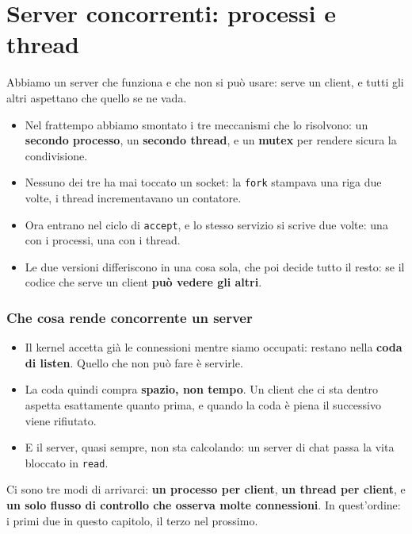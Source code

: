 \chapter{Server concorrenti: processi e thread}

Abbiamo un server che funziona e che non si può usare: serve un client, e tutti gli altri aspettano che quello se ne vada.
\begin{itemize}
    \item Nel frattempo abbiamo smontato i tre meccanismi che lo risolvono: un \textbf{secondo processo}, un \textbf{secondo
          thread}, e un \textbf{mutex} per rendere sicura la condivisione.
    \item Nessuno dei tre ha mai toccato un socket: la \texttt{fork} stampava una riga due volte, i thread incrementavano un
          contatore.
    \item Ora entrano nel ciclo di \texttt{accept}, e lo stesso servizio si scrive due volte: una con i processi, una con i
          thread.
    \item Le due versioni differiscono in una cosa sola, che poi decide tutto il resto: se il codice che serve un client
          \textbf{può vedere gli altri}.
\end{itemize}

\subsection{Che cosa rende concorrente un server}

\begin{itemize}
    \item Il kernel accetta già le connessioni mentre siamo occupati: restano nella \textbf{coda di listen}. Quello che non
          può fare è servirle.
    \item La coda quindi compra \textbf{spazio, non tempo}. Un client che ci sta dentro aspetta esattamente quanto prima, e
          quando la coda è piena il successivo viene rifiutato.
    \item E il server, quasi sempre, non sta calcolando: un server di chat passa la vita bloccato in \texttt{read}.
\end{itemize}


Ci sono tre modi di arrivarci: \textbf{un processo per client}, \textbf{un thread per client}, e \textbf{un solo flusso di
controllo che osserva molte connessioni}. In quest'ordine: i primi due in questo capitolo, il terzo nel prossimo.

